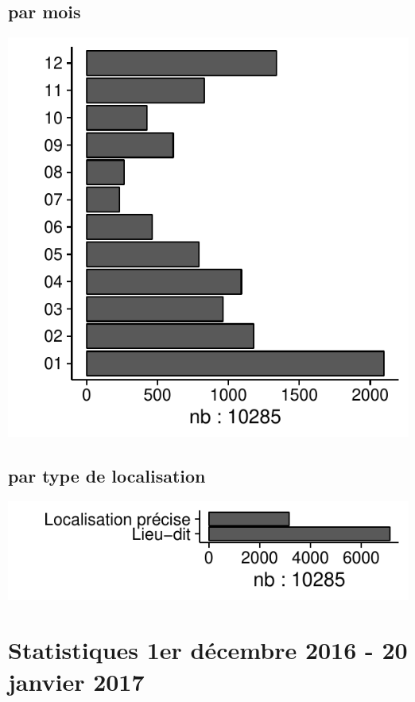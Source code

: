 \subsection*{par mois}
\includegraphics[width=\malargeurgraphique]{images/faune_prec_stat_champ_mois.pdf}
\subsection*{par type de localisation}
\includegraphics[width=\malargeurgraphique]{images/faune_prec_stat_champ_PRECISION.pdf}
\section*{Statistiques 1er décembre 2016 - 20 janvier 2017}

